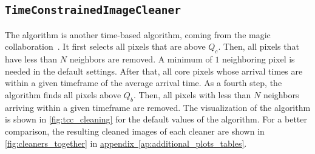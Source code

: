 \subsection*{\texttt{TimeConstrainedImageCleaner}}%
\vspace{-0.5cm}
The \tcc{} algorithm is another time-based algorithm, coming from the \gls{magic} collaboration~\cite{tcc}.
It first selects all pixels that are above \(Q_c\). Then, all pixels that have
less than \(N\) neighbors are removed. A minimum of \(\num{1}\) neighboring pixel is needed in the default
settings. After that, all core pixels whose arrival times are within a given timeframe of the average arrival time.
As a fourth step, the \tcc{} algorithm finds all pixels above \(Q_b\). Then, all pixels with
less than \(N\) neighbors arriving within a given timeframe are removed.
The visualization of the algorithm is shown in \autoref{fig:tcc_cleaning} for the default values of the algorithm.
For a better comparison, the resulting cleaned images of each cleaner are shown in \autoref{fig:cleaners_together}
in \hyperref[ap:additional_plots_tables]{appendix~\ref{ap:additional_plots_tables}}.
